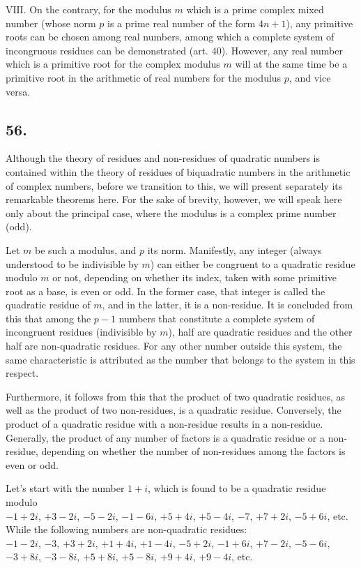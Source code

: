 \documentclass[twoside,12pt, showframe]{memoir}
\begin{document}
\(\text{VIII.}\) On the contrary, for the modulus \(m\) which is a prime complex mixed number (whose norm \(p\) is a prime real number of the form \(4 n+1\)), any primitive roots can be chosen among real numbers, among which a complete system of incongruous residues can be demonstrated (art. 40). However, any real number which is a primitive root for the complex modulus \(m\) will at the same time be a primitive root in the arithmetic of real numbers for the modulus \(p\), and vice versa.
%

\subsection*{56.}
 
Although the theory of residues and non-residues of quadratic numbers is contained within the theory of residues of biquadratic numbers in the arithmetic of complex numbers, before we transition to this, we will present separately its remarkable theorems here. For the sake of brevity, however, we will speak here only about the principal case, where the modulus is a complex prime number (odd).
%

Let \(m\) be such a modulus, and \(p\) its norm. Manifestly, any integer (always understood to be indivisible by \(m\)) can either be congruent to a quadratic residue modulo \(m\) or not, depending on whether its index, taken with some primitive root as a base, is even or odd. In the former case, that integer is called the quadratic residue of \(m\), and in the latter, it is a non-residue. It is concluded from this that among the \(p-1\) numbers that constitute a complete system of incongruent residues (indivisible by \(m\)), half are quadratic residues and the other half are non-quadratic residues. For any other number outside this system, the same characteristic is attributed as the number that belongs to the system in this respect.

Furthermore, it follows from this that the product of two quadratic residues, as well as the product of two non-residues, is a quadratic residue. Conversely, the product of a quadratic residue with a non-residue results in a non-residue. Generally, the product of any number of factors is a quadratic residue or a non-residue, depending on whether the number of non-residues among the factors is even or odd.
%

Let's start with the number \(1+i\), which is found to be a quadratic residue modulo\\
\(-1+2 i\), \(+3-2 i\), \(-5-2 i\), \(-1-6 i\), \(+5+4 i\), \(+5-4 i\), \(-7\), \(+7+2 i\), \(-5+6 i\), etc.\\
While the following numbers are non-quadratic residues:\\
\(-1-2 i\), \(-3\), \(+3+2 i\), \(+1+4 i\), \(+1-4 i\), \(-5+2 i\), \(-1+6 i\), \(+7-2 i\), \(-5-6 i\), \(-3+8 i\), \(-3-8 i\), \(+5+8 i\), \(+5-8 i\), \(+9+4 i\), \(+9-4 i\), etc.
%
\end{document}
